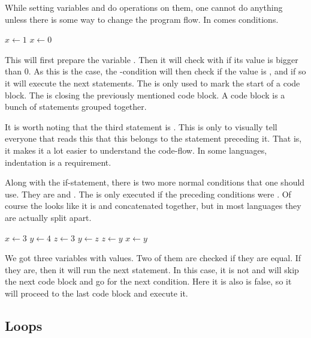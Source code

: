 While setting variables and do operations on them, one cannot do anything unless there is some way to change the program flow. In comes conditions.

\begin{algorithm}[H]
	\begin{algorithmic}[1]
		\State $x \gets 1$
			\State $x \gets 0$
		\EndIf
	\end{algorithmic}
\end{algorithm}

This will first prepare the variable . Then it will check with if its value is bigger than 0. As this is the case, the -condition will then check if the value is , and if so it will execute the next statements. The  is only used to mark the start of a code block. The  is closing the previously mentioned code block. A code block is a bunch of statements grouped together.

It is worth noting that the third statement is . This is only to visually tell everyone that reads this that this belongs to the statement preceding it. That is, it makes it a lot easier to understand the code-flow. In some languages, indentation is a requirement.

Along with the if-statement, there is two more normal conditions that one should use. They are  and . The  is only executed if the preceding conditions were . Of course the  looks like it is  and  concatenated together, but in most languages they are actually split apart.

\begin{algorithm}[H]
	\begin{algorithmic}[1]
		\State $x \gets 3$
		\State $y \gets 4$
		\State $z \gets 3$
			\State $y \gets z$
			\State $z \gets y$
		\Else
			\State $x \gets y$
		\EndIf
	\end{algorithmic}
\end{algorithm}

We got three variables with values. Two of them are checked if they are equal. If they are, then it will run the next statement. In this case, it is not and will skip the next code block and go for the next condition. Here it is also is false, so it will proceed to the last code block and execute it.

\subsection{Loops}


